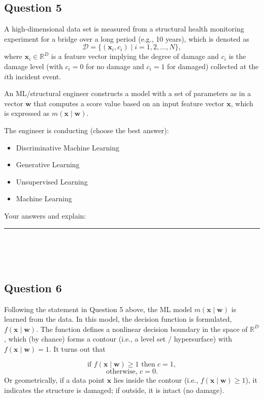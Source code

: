 \documentclass[12pt]{article}
\begin{document}
\newpage

\subsection*{Question 5}

A high-dimensional data set is measured from a structural health monitoring experiment for a bridge over a long period (e.g., 10 years), which is denoted as
\[
\mathcal{D} = \{(\bm{x}_i, c_i) \mid i = 1, 2, \ldots, N\},
\]
where \(\bm{x}_i \in \mathbb{R}^D\) is a feature vector implying the degree of damage and \(c_i\) is the damage level (with \(c_i=0\) for no damage and \(c_i=1\) for damaged) collected at the \(i\)th incident event.

An ML/structural engineer constructs a model with a set of parameters as in a vector \(\bm{w}\) that computes a score value based on an input feature vector \(\bm{x}\), which is expressed as \(m(\bm{x}\mid \bm{w})\).

The engineer is conducting (choose the best answer):
\begin{itemize}
    \item [A.] Discriminative Machine Learning
    \item [B.]Generative Learning
    \item [C.]Unsupervised Learning
    \item [D.] Machine Learning
\end{itemize}
Your answers and explain: \rule{1in}{0.15mm}\\

\fullunderline \\


\fullunderline \\

\newpage
\subsection*{Question 6} 

Following the statement in Question 5 above, the ML model \(m(\bm{x}\mid \bm{w})\) is learned from the data. In this model, the decision function is formulated, $f(\bm{x}\mid \bm{w})$. The function defines a nonlinear decision boundary in the space of $\mathbb{R}^D$, which (by chance) forms a contour (i.e., a level set / hypersurface) with $f(\bm{x}\mid \bm{w}) = 1$. It turns out that 

\[
\text{if } f(\bm{x}\mid \bm{w}) \geq 1 \text{ then } c = 1,
\]
\[
\text{otherwise, } c = 0.
\]
Or geometrically, if a data point $\bm{x}$ lies inside the contour (i.e., $f(\bm{x}\mid \bm{w})\ge 1$), it indicates the structure is damaged; if outside, it is intact (no damage). 
\end{document}

